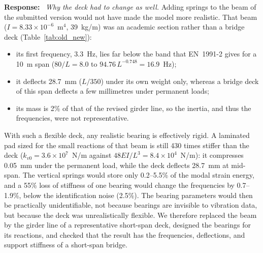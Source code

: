 \documentclass[11pt]{article}
\newenvironment{response}{\par\smallskip\noindent\color{resp}\textbf{Response:}\ }{\par}
\begin{document}
\begin{response}
\textit{Why the deck had to change as well.} Adding springs to the beam of the submitted version would not have made the
model more realistic. That beam ($I=8.33\times10^{-6}$~m$^4$, 39~kg/m) was an academic section rather than a bridge
deck (Table~\ref{tab:old_new}):
\begin{itemize}[leftmargin=*]
\item its first frequency, 3.3~Hz, lies far below the band that EN~1991-2 gives for a 10~m span
($80/L=8.0$ to $94.76\,L^{-0.748}=16.9$~Hz);
\item it deflects 28.7~mm ($L/350$) under its own weight only, whereas a bridge deck of this span deflects a few
millimetres under permanent loads;
\item its mass is 2\% of that of the revised girder line, so the inertia, and thus the frequencies, were not
representative.
\end{itemize}
With such a flexible deck, any realistic bearing is effectively rigid. A laminated pad sized for the small reactions of
that beam is still 430 times stiffer than the deck ($k_{v0}=3.6\times10^{7}$~N/m against $48EI/L^3=8.4\times10^{4}$~N/m):
it compresses 0.05~mm under the permanent load, while the deck deflects 28.7~mm at mid-span. The vertical springs would
store only 0.2--5.5\% of the modal strain energy, and a 55\% loss of stiffness of one bearing would change the
frequencies by 0.7--1.9\%, below the identification noise (2.5\%). The bearing parameters would then be practically
unidentifiable, not because bearings are invisible to vibration data, but because the deck was unrealistically
flexible. We therefore replaced the beam by the girder line of a representative short-span deck, designed the bearings
for its reactions, and
checked that the result has the frequencies, deflections, and support stiffness of a short-span bridge.


\end{response}
\end{document}
